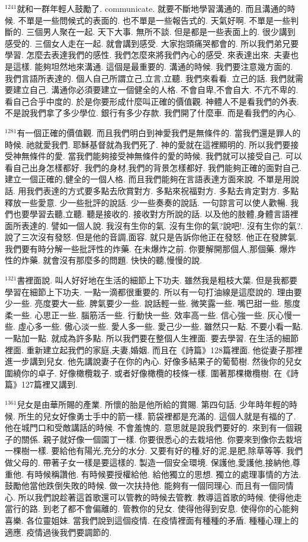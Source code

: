 \documentclass{book}
\begin{document}
$^{1241}$就和一群年輕人鼓勵了.
communicate.
就要不斷地學習溝通的.
而且溝通的時候.
不單是一些問候式的表面的.
也不單是一些報告式的.
天氣好啊.
不單是一些判斷的.
三個男人聚在一起.
天下大事.
無所不談.
但是都是一些表面上的.
很少講到感受的.
三個女人走在一起.
就會講到感受.
大家抱頭痛哭都會的.
所以我們弟兄要學習.
怎麼去表達我們的感性.
我們怎麼來將我們內心的感受.
來表達出來.
夫妻也是這樣.
能夠坦然地來溝通.
這個是最重要的.
溝通的時候.
我們要注意幾方面的.
我們言語所表達的.
個人自己所謂立己,立言,立聽.
我們來看看.
立己的話.
我們就需要建立自己.
溝通你必須要建立一個健全的人格.
不會自卑,不會自大.
不亢不卑的.
看自己合乎中度的.
於是你要形成什麼叫正確的價值觀.
神體人不是看我們的外表.
不是說我們拿了多少學位.
銀行有多少存款.
我們開了什麼車.
而是看我們的內心.

$^{1281}$有一個正確的價值觀.
而且我們明白到神愛我們是無條件的.
當我們還是罪人的時候.
祂就愛我們.
耶穌基督就為我們死了.
神的愛就在這裡顯明的.
所以我們要接受神無條件的愛.
當我們能夠接受神無條件的愛的時候.
我們就可以接受自己.
可以看自己出身怎樣都好.
我們的身材,我們的背景怎樣都好.
我們能夠正確的面對自己.
建立一個正確的,健全的一個人格.
而且我們能夠在言語表達方面來說.
不單是用說話.
用我們表達的方式要多點去欣賞對方.
多點來祝福對方.
多點去肯定對方.
多點釋放一些愛意.
少一些批評的說話.
少一些奏奏的說話.
一句諒言可以使人歡暢.
我們也要學習去聽,立聽.
聽是接收的.
接收對方所說的話.
以及他的肢體,身體言語裡面所表達的.
譬如一個人說.
我沒有生你的氣.
沒有生你的氣?說吧!.
沒有生你的氣?.
說了三次沒有發怒.
但是他的音調,面容.
就只是告訴你他正在發怒.
他正在發脾氣.
我們要有時分解一些批評性的炸藥.
在未爆炸之前.
你要解開那個人,那個藥.
爆炸性的炸藥.
就會沒有那麼多的問題.
快快的聽,慢慢的說.

$^{1321}$書裡面說.
叫人好好地在生活的細節上下功夫.
雖然我是粗枝大葉.
但是我都要學習在細節上下功夫.
一點一滴都很重要的.
所以有一句打油線是這麼說的.
理由要少一些.
亮度要大一些.
脾氣要少一些.
說話輕一些.
微笑露一些.
嘴巴甜一些.
態度柔一些.
心思正一些.
腦筋活一些.
行動快一些.
效率高一些.
信心強一些.
灰心慢一些.
虛心多一些.
傲心淡一些.
愛人多一些.
愛己少一些.
雖然只一點.
不要小看一點.
一點加一點.
就成為許多點.
所以我們要在整個人生裡面.
要去學習.
在生活的細節裡面.
重新建立起我們的家庭,夫妻,婚姻.
而且在《詩篇》128篇裡面.
他從妻子那裡進一步講到兒女.
他先講說妻子在你的內心.
好像多結果子的葡萄樹.
然後你的兒女圍繞你的卓子.
好像橄欖栽子.
或者好像橄欖的枝條一樣.
圍著那棵橄欖樹.
在《詩篇》127篇裡又講到.

$^{1361}$兒女是由華所賜的產業.
所懷的胎是他所給的賞賜.
第四句話.
少年時年輕的時候.
所生的兒女好像勇士手中的箭一樣.
箭袋裡都是充滿的.
這個人就是有福的了.
他在城門口和受敵講話的時候.
不會羞愧的.
意思就是說我們要好的.
來到有一個親子的關係.
親子就好像一個園丁一樣.
你要很悉心的去栽培他.
你要來到像你去栽培一棵樹一樣.
要給他有陽光,充分的水分.
又要有好的種,好的泥,是肥,除草等等.
我們做父母的.
帶著子女一樣是要這樣的.
製造一個安全環境.
保護他,愛護他,接納他,尊重他.
有時候稱讚他.
有時候要授權給他.
給他獨立的思想.
獨立的處理事情的方法.
鼓勵他當他跌倒失敗的時候.
做一次扶持他.
能夠有一個同理心.
而且有一個同情心.
所以我們說趁著這首歌還可以管教的時候去管教.
教導這首歌的時候.
使得他走當行的路.
到老了都不會偏離的.
管教你的兒女.
使得他得到安息.
使得你的心能夠喜樂.
各位靈姐妹.
當我們說到這個疫情.
在疫情裡面有種種的矛盾.
種種心理上的適應.
疫情過後我們要調節的.
\end{document}

